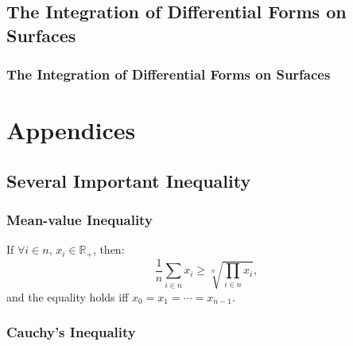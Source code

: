 \documentclass[openany]{book}
\begin{document}
\chapter{The Integration of Differential Forms on Surfaces}
\section{The Integration of Differential Forms on Surfaces}

\begin{definition}
	
\end{definition}



\appendix
\part{Appendices}
\chapter{Several Important Inequality}
\section{Mean-value Inequality}
\begin{theorem}[AM-GM inequality]
	\label{theorem: AM-GM inequality}
	If $\forall i \in n$, $x_i \in \mathbb R_+$, then:
	\begin{equation}
		\label{equation: AM-GM inequality}
		\frac{1}{n} \sum_{i \in n} x_i \geq \sqrt[n]{\prod_{i \in n} x_i},
	\end{equation}
	and the equality holds iff $x_0 = x_1 = \cdots = x_{n-1}$.
\end{theorem}

\section{Cauchy's Inequality}
\end{document}
